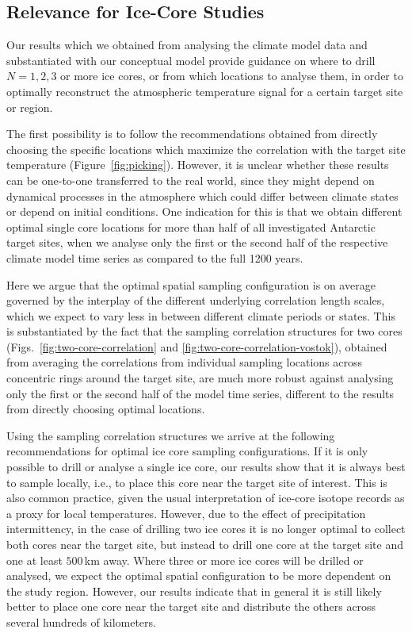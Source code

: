 \documentclass[draft]{agujournal2019}
\begin{document}
\subsection{Relevance for Ice-Core Studies}
\label{discussion:relevance}

Our results which we obtained from analysing the climate model data and
substantiated with our conceptual model provide guidance on where to drill
$N=1, 2, 3$ or more ice cores, or from which locations to analyse them, in order
to optimally reconstruct the atmospheric temperature signal for a certain target
site or region.

The first possibility is to follow the recommendations obtained from directly
choosing the specific locations which maximize the correlation with the target
site temperature (Figure~\ref{fig:picking}). However, it is unclear whether these
results can be one-to-one transferred to the real world, since they might depend
on dynamical processes in the atmosphere which could differ between climate
states or depend on initial conditions. One indication for this is that we
obtain different optimal single core locations for more than half of all
investigated Antarctic target sites, when we analyse only the first or the
second half of the respective climate model time series as compared to the full
1200 years.

Here we argue that the optimal spatial sampling configuration is on average
governed by the interplay of the different underlying correlation length scales,
which we expect to vary less in between different climate periods or states.
This is substantiated by the fact that the sampling correlation structures for
two cores (Figs.~\ref{fig:two-core-correlation} and
\ref{fig:two-core-correlation-vostok}), obtained from averaging the correlations
from individual sampling locations  across concentric rings around the target
site, are much more robust against analysing only the first or the second half
of the model time series, different to the results from directly choosing
optimal locations.

Using the sampling correlation structures we arrive at the following
recommendations for optimal ice core sampling configurations. If it is only
possible to drill or analyse a single ice core, our results show that it is
always best to sample locally, i.e., to place this core near the target site of
interest. This is also common practice, given the usual interpretation of
ice-core isotope records as a proxy for local temperatures. However, due to the
effect of precipitation intermittency, in the case of drilling two ice cores it
is no longer optimal to collect both cores near the target site, but instead to
drill one core at the target site and one at least $500$\,km away. Where three
or more ice cores will be drilled or analysed, we expect the optimal spatial
configuration to be more dependent on the study region. However, our results
indicate that in general it is still likely better to place one core near the
target site and distribute the others across several hundreds of kilometers.
\end{document}
